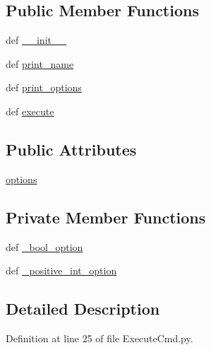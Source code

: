 \subsection*{Public Member Functions}
\begin{DoxyCompactItemize}
\item 
def \hyperlink{classExecuteCmd_1_1ExecuteCmd_ae0e361beb27aac47f2c682418577b375}{\-\_\-\-\_\-init\-\_\-\-\_\-}
\item 
def \hyperlink{classExecuteCmd_1_1ExecuteCmd_a9021ad1c3f3ed4460d57d42a8d1f23ef}{print\-\_\-name}
\item 
def \hyperlink{classExecuteCmd_1_1ExecuteCmd_a8174353fba2a214e50529b2612e078ff}{print\-\_\-options}
\item 
def \hyperlink{classExecuteCmd_1_1ExecuteCmd_abd51ca569e60d044fe278b613459c709}{execute}
\end{DoxyCompactItemize}
\subsection*{Public Attributes}
\begin{DoxyCompactItemize}
\item 
\hyperlink{classExecuteCmd_1_1ExecuteCmd_aea248b8edd01b26099f3d45b798a65be}{options}
\end{DoxyCompactItemize}
\subsection*{Private Member Functions}
\begin{DoxyCompactItemize}
\item 
def \hyperlink{classExecuteCmd_1_1ExecuteCmd_a4ab1a3d66079bcb8de5a4a436282ab5c}{\-\_\-bool\-\_\-option}
\item 
def \hyperlink{classExecuteCmd_1_1ExecuteCmd_a657ac6b5c7779499ce426ba18234824e}{\-\_\-positive\-\_\-int\-\_\-option}
\end{DoxyCompactItemize}


\subsection{Detailed Description}


Definition at line 25 of file Execute\-Cmd.\-py.



